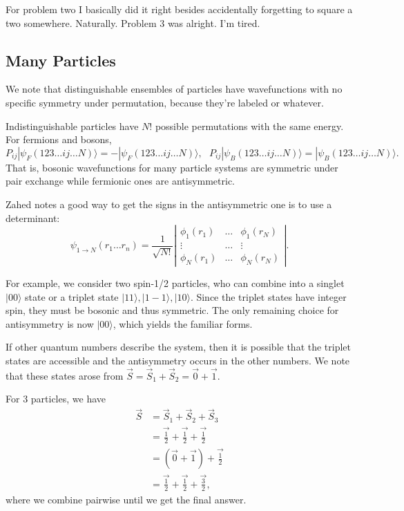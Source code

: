 \documentclass[fontsize=12pt]{scrartcl}
\newcommand{\ra}{\rangle}
\begin{document}
For problem two I basically did it right besides accidentally forgetting to square a two somewhere. Naturally. Problem 3 was alright. I'm tired.

\subsection{Many Particles}

We note that distinguishable ensembles of particles have wavefunctions with no specific symmetry under permutation, because they're labeled or whatever.

Indistinguishable particles have $N!$ possible permutations with the same energy. For fermions and bosons, $$P_{ij}|\psi_F(123\dots ij \dots N)\ra = -|\psi_F(123\dots ij \dots N)\ra, \ \ \ P_{ij}|\psi_B(123\dots ij \dots N)\ra = |\psi_B(123\dots ij \dots N)\ra.$$ That is, bosonic wavefunctions for many particle systems are symmetric under pair exchange while fermionic ones are antisymmetric.

Zahed notes a good way to get the signs in the antisymmetric one is to use a determinant: $$\psi_{1\to N}(r_1\dots r_n)= \frac{1}{\sqrt{N!}} \left|\begin{matrix}
\phi_1(r_1) & \dots & \phi_1(r_N)\\
\vdots & \dots & \vdots \\
\phi_N(r_1) & \dots & \phi_N(r_N)
\end{matrix}\right|.$$

For example, we consider two spin-1/2 particles, who can combine into a singlet $|00\ra$ state or a triplet state $|11\ra, |1-1\ra, |10\ra$. Since the triplet states have integer spin, they must be bosonic and thus symmetric. The only remaining choice for antisymmetry is now $|00\ra$, which yields the familiar forms.

If other quantum numbers describe the system, then it is possible that the triplet states are accessible and the antisymmetry occurs in the other numbers. We note that these states arose from $\vec{S}=\vec{S}_1+\vec{S}_2 = \vec{0}+\vec{1}$.

For 3 particles, we have \begin{align*}\vec{S}&=\vec{S}_1+\vec{S}_2+\vec{S}_3\\ &= \vec{\frac{1}{2}} + \vec{\frac{1}{2}} + \vec{\frac{1}{2}}\\
&= (\vec{0}+\vec{1})+\vec{\frac{1}{2}} \\ &= \vec{\frac{1}{2}} + \vec{\frac{1}{2}} + \vec{\frac{3}{2}},
\end{align*} where we combine pairwise until we get the final answer.
\end{document}
